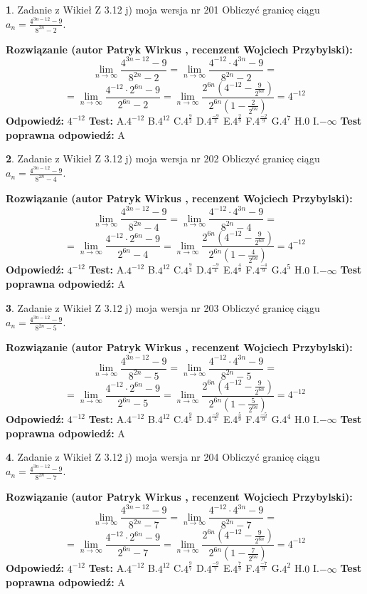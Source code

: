 \documentclass[12pt, a4paper]{article}
\theoremstyle{definition} %
\newtheorem{zad}{}
\newcommand{\zadStart}[1]{\begin{zad}#1\newline}
\newcommand{\zadStop}{\end{zad}}
\newcommand{\rozwStart}[2]{\noindent \textbf{Rozwiązanie (autor #1 , recenzent #2): }\newline}
\newcommand{\rozwStop}{\newline}
\newcommand{\odpStart}{\noindent \textbf{Odpowiedź:}\newline}
\newcommand{\odpStop}{\newline}
\newcommand{\testStart}{\noindent \textbf{Test:}\newline}
\newcommand{\testStop}{\newline}
\newcommand{\kluczStart}{\noindent \textbf{Test poprawna odpowiedź:}\newline}
\newcommand{\kluczStop}{\newline}
\begin{document}
\zadStart{Zadanie z Wikieł Z 3.12 j) moja wersja nr 201}
Obliczyć granicę ciągu $a_{n}=\frac{4^{3n-12}-9}{8^{2n}-2}$.
\zadStop
\rozwStart{Patryk Wirkus}{Wojciech Przybylski}
$$\lim\limits_{n\to\infty}\frac{4^{3n-12}-9}{8^{2n}-2}= \lim\limits_{n\to\infty}\frac{4^{-12} \cdot 4^{3n}-9}{8^{2n}-2}=$$
$$= \lim\limits_{n\to\infty}\frac{4^{-12} \cdot 2^{6n}-9}{2^{6n}-2}= \lim\limits_{n\to\infty}\frac{2^{6n}(4^{-12} - \frac{9}{2^{6n}})}{2^{6n}(1-\frac{2}{2^{6n}})}= 4^{-12}$$
\rozwStop
\odpStart
$4^{-12}$
\odpStop
\testStart
A.$4^{-12}$
B.$4^{12}$
C.$4^{\frac{9}{2}}$
D.$4^{\frac{-9}{2}}$
E.$4^{\frac{2}{9}}$
F.$4^{\frac{-2}{9}}$
G.$4^{7}$
H.$0$
I.$-\infty$
\testStop
\kluczStart
A
\kluczStop



\zadStart{Zadanie z Wikieł Z 3.12 j) moja wersja nr 202}
Obliczyć granicę ciągu $a_{n}=\frac{4^{3n-12}-9}{8^{2n}-4}$.
\zadStop
\rozwStart{Patryk Wirkus}{Wojciech Przybylski}
$$\lim\limits_{n\to\infty}\frac{4^{3n-12}-9}{8^{2n}-4}= \lim\limits_{n\to\infty}\frac{4^{-12} \cdot 4^{3n}-9}{8^{2n}-4}=$$
$$= \lim\limits_{n\to\infty}\frac{4^{-12} \cdot 2^{6n}-9}{2^{6n}-4}= \lim\limits_{n\to\infty}\frac{2^{6n}(4^{-12} - \frac{9}{2^{6n}})}{2^{6n}(1-\frac{4}{2^{6n}})}= 4^{-12}$$
\rozwStop
\odpStart
$4^{-12}$
\odpStop
\testStart
A.$4^{-12}$
B.$4^{12}$
C.$4^{\frac{9}{4}}$
D.$4^{\frac{-9}{4}}$
E.$4^{\frac{4}{9}}$
F.$4^{\frac{-4}{9}}$
G.$4^{5}$
H.$0$
I.$-\infty$
\testStop
\kluczStart
A
\kluczStop



\zadStart{Zadanie z Wikieł Z 3.12 j) moja wersja nr 203}
Obliczyć granicę ciągu $a_{n}=\frac{4^{3n-12}-9}{8^{2n}-5}$.
\zadStop
\rozwStart{Patryk Wirkus}{Wojciech Przybylski}
$$\lim\limits_{n\to\infty}\frac{4^{3n-12}-9}{8^{2n}-5}= \lim\limits_{n\to\infty}\frac{4^{-12} \cdot 4^{3n}-9}{8^{2n}-5}=$$
$$= \lim\limits_{n\to\infty}\frac{4^{-12} \cdot 2^{6n}-9}{2^{6n}-5}= \lim\limits_{n\to\infty}\frac{2^{6n}(4^{-12} - \frac{9}{2^{6n}})}{2^{6n}(1-\frac{5}{2^{6n}})}= 4^{-12}$$
\rozwStop
\odpStart
$4^{-12}$
\odpStop
\testStart
A.$4^{-12}$
B.$4^{12}$
C.$4^{\frac{9}{5}}$
D.$4^{\frac{-9}{5}}$
E.$4^{\frac{5}{9}}$
F.$4^{\frac{-5}{9}}$
G.$4^{4}$
H.$0$
I.$-\infty$
\testStop
\kluczStart
A
\kluczStop



\zadStart{Zadanie z Wikieł Z 3.12 j) moja wersja nr 204}
Obliczyć granicę ciągu $a_{n}=\frac{4^{3n-12}-9}{8^{2n}-7}$.
\zadStop
\rozwStart{Patryk Wirkus}{Wojciech Przybylski}
$$\lim\limits_{n\to\infty}\frac{4^{3n-12}-9}{8^{2n}-7}= \lim\limits_{n\to\infty}\frac{4^{-12} \cdot 4^{3n}-9}{8^{2n}-7}=$$
$$= \lim\limits_{n\to\infty}\frac{4^{-12} \cdot 2^{6n}-9}{2^{6n}-7}= \lim\limits_{n\to\infty}\frac{2^{6n}(4^{-12} - \frac{9}{2^{6n}})}{2^{6n}(1-\frac{7}{2^{6n}})}= 4^{-12}$$
\rozwStop
\odpStart
$4^{-12}$
\odpStop
\testStart
A.$4^{-12}$
B.$4^{12}$
C.$4^{\frac{9}{7}}$
D.$4^{\frac{-9}{7}}$
E.$4^{\frac{7}{9}}$
F.$4^{\frac{-7}{9}}$
G.$4^{2}$
H.$0$
I.$-\infty$
\testStop
\kluczStart
A
\kluczStop
\end{document}
